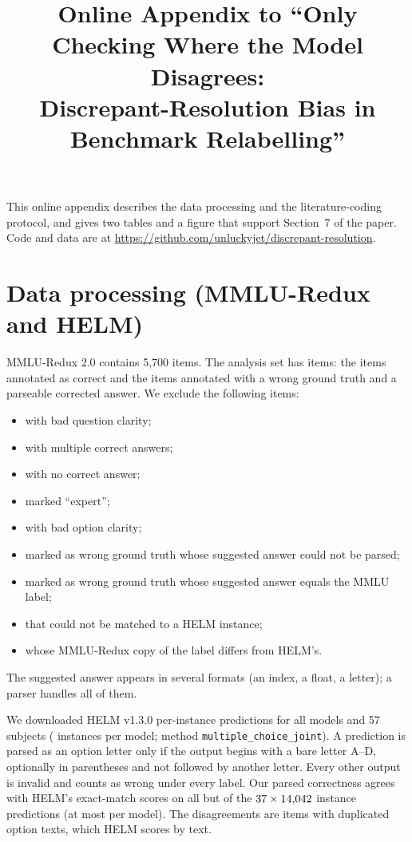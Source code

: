 \documentclass[twoside,11pt]{article}
\begin{document}
\title{Online Appendix to ``Only Checking Where the Model Disagrees:\\ Discrepant-Resolution Bias in Benchmark Relabelling''}
\maketitle

This online appendix describes the data processing and the literature-coding protocol, and gives two tables and a figure that support Section~7 of the paper. Code and data are at \url{https://github.com/unluckyjet/discrepant-resolution}.

\section{Data processing (MMLU-Redux and HELM)}


MMLU-Redux 2.0 contains 5{,}700 items. The analysis set has \nItems{} items: the \nOk{} items annotated as correct and the \nWrongGt{} items annotated with a wrong ground truth and a parseable corrected answer. We exclude the following items:
\begin{itemize}
\item \nBadQ{} with bad question clarity;
\item \nMulti{} with multiple correct answers;
\item \nNoCorrect{} with no correct answer;
\item \nExpert{} marked ``expert'';
\item \nBadOpt{} with bad option clarity;
\item \nUnparsed{} marked as wrong ground truth whose suggested answer could not be parsed;
\item \nSameAsLabel{} marked as wrong ground truth whose suggested answer equals the MMLU label;
\item \nNoMatch{} that could not be matched to a HELM instance;
\item \nLabelDiffers{} whose MMLU-Redux copy of the label differs from HELM's.
\end{itemize}
The suggested answer appears in several formats (an index, a float, a letter); a parser handles all of them.

We downloaded HELM v1.3.0 per-instance predictions for all \nModels{} models and 57 subjects (\helmInstances{} instances per model; method \texttt{multiple\_choice\_joint}). A prediction is parsed as an option letter only if the output begins with a bare letter A--D, optionally in parentheses and not followed by another letter. Every other output is invalid and counts as wrong under every label. Our parsed correctness agrees with HELM's exact-match scores on all but \helmDisagreeTotal{} of the $37\times14{,}042$ instance predictions (at most \helmDisagreeMax{} per model). The disagreements are items with duplicated option texts, which HELM scores by text.
\end{document}
